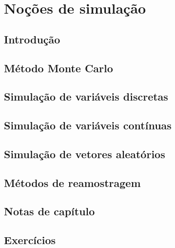 \documentclass[
]{latex/krantz}
\theoremstyle{definition}
\theoremstyle{definition}
\theoremstyle{definition}
\theoremstyle{definition}
\theoremstyle{remark}
\begin{document}
\hypertarget{nouxe7uxf5es-de-simulauxe7uxe3o}{%
\chapter{Noções de simulação}\label{nouxe7uxf5es-de-simulauxe7uxe3o}}

\hypertarget{introduuxe7uxe3o-14}{%
\section{Introdução}\label{introduuxe7uxe3o-14}}

\hypertarget{muxe9todo-monte-carlo}{%
\section{Método Monte Carlo}\label{muxe9todo-monte-carlo}}

\hypertarget{simulauxe7uxe3o-de-variuxe1veis-discretas}{%
\section{Simulação de variáveis discretas}\label{simulauxe7uxe3o-de-variuxe1veis-discretas}}

\hypertarget{simulauxe7uxe3o-de-variuxe1veis-contuxednuas}{%
\section{Simulação de variáveis contínuas}\label{simulauxe7uxe3o-de-variuxe1veis-contuxednuas}}

\hypertarget{simulauxe7uxe3o-de-vetores-aleatuxf3rios}{%
\section{Simulação de vetores aleatórios}\label{simulauxe7uxe3o-de-vetores-aleatuxf3rios}}

\hypertarget{muxe9todos-de-reamostragem}{%
\section{Métodos de reamostragem}\label{muxe9todos-de-reamostragem}}

\hypertarget{notas-de-capuxedtulo-14}{%
\section{Notas de capítulo}\label{notas-de-capuxedtulo-14}}

\hypertarget{exercuxedcios-14}{%
\section{Exercícios}\label{exercuxedcios-14}}
\end{document}
